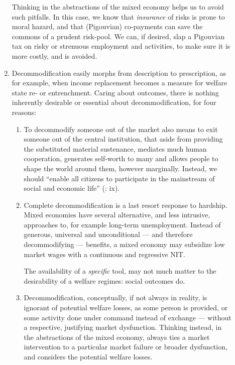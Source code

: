 \begin{description}
\begin{enumerate}
		Thinking in the abstractions of the mixed economy helps us to avoid such pitfalls. In this case, we know that \emph{insurance} of risks is prone to moral hazard, and that (Pigouvian) co-payments can save the commons of a prudent risk-pool. We can, if desired, slap a Pigouvian tax on risky or strenuous employment and activities, to make sure it is more costly, and is avoided.
		
		\item Decommodification easily morphs from description to prescription, as for example, when income replacement becomes a measure for welfare state re- or entrenchment. %
		Caring about outcomes, there is nothing inherently desirable or essential about decommodification, for four reasons:
			\begin{enumerate}
				\item To decommodify someone out of the market also means to exit someone out of the central institution, that aside from providing the substituted material sustenance, mediates much human cooperation, generates self-worth to many and allows people to shape the world around them, however marginally. Instead, we should ``enable all citizens to participate in the mainstream of social and economic life'' (\citealt{Esping-Andersen2002}: ix).

				\item Complete decommodification is a last resort response to hardship. Mixed economies have several alternative, and less intrusive, approaches to, for example long-term unemployment. Instead of generous, universal and unconditional --- and therefore decommodifying --- benefits, a mixed economy may subsidize low market wages with a continuous and regressive \gls{NIT}. 
				
				The availability of a \emph{specific} tool, may not much matter to the desirability of a welfare regimes: social outcomes do.

				\item Decommodification, conceptually, if not always in reality, is ignorant of potential welfare losses, as some person is provided, or some activity done under command instead of exchange --- without a respective, justifying market dysfunction. Thinking instead, in the abstractions of the mixed economy, always ties a market intervention to a particular market failure or broader dysfunction, and considers the potential welfare losses.
			\end{enumerate} 
			

\end{enumerate}
\end{description}
